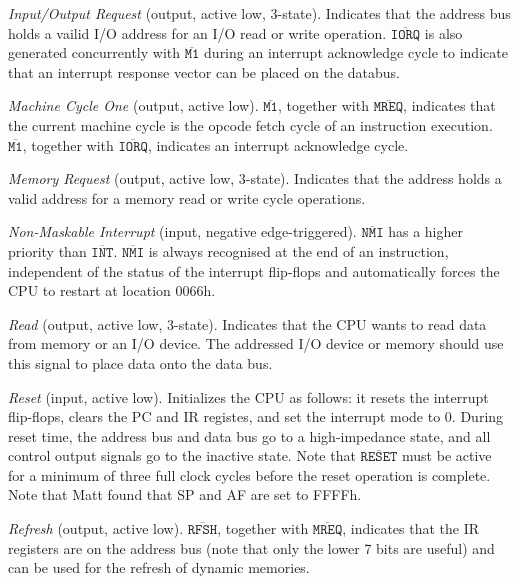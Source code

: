 \documentclass[oneside,a4paper]{book}
\begin{document}
\begin{description}[leftmargin=1.5em]
	\item[$\mathtt{\overline{IORQ}}$]
	{\em Input/Output Request} (output, active low, 3-state). Indicates that
	the address bus holds a vailid I/O address for an I/O read or write 
	operation. $\mathtt{\overline{IORQ}}$ is also generated concurrently with
	$\mathtt{\overline{M1}}$ during an interrupt acknowledge cycle to indicate
	that an interrupt response vector can be placed on the databus.

	\item[$\mathtt{\overline{M1}}$]
	{\em Machine Cycle One} (output, active low). $\mathtt{\overline{M1}}$,
	together with $\mathtt{\overline{MREQ}}$, indicates that the current 
	machine cycle is the opcode fetch cycle of an instruction execution.
	$\mathtt{\overline{M1}}$, together with $\mathtt{\overline{IORQ}}$,
	indicates an interrupt acknowledge cycle.

	\item[$\mathtt{\overline{MREQ}}$]
	{\em Memory Request} (output, active low, 3-state). Indicates that the
	address holds a valid address for a memory read or write cycle operations.

	\item[$\mathtt{\overline{NMI}}$]
	{\em Non-Maskable Interrupt} (input, negative edge-triggered). 
	$\mathtt{\overline{NMI}}$ has a higher priority than 
	$\mathtt{\overline{INT}}$. $\mathtt{\overline{NMI}}$ is always recognised 
	at the end of an instruction, independent of the status of the 
	interrupt flip-flops and automatically forces the CPU to restart at 
	location 0066h.

	\item[$\mathtt{\overline{RD}}$]
	{\em Read} (output, active low, 3-state). Indicates that the 
	CPU wants to read data from memory or an I/O device. The addressed I/O device
	or memory should use this signal to place data onto the data bus.

	\item[$\mathtt{\overline{RESET}}$]
	{\em Reset} (input, active low). Initializes the CPU as follows: it resets
	the interrupt flip-flops, clears the PC and IR registes, and set the 
	interrupt mode to 0. During reset time, the address bus and data bus go
	to a high-impedance state, and all control output signals go to 
	the inactive state. Note that $\mathtt{\overline{RESET}}$ must be active
	for a minimum of three full clock cycles before the reset operation is
	complete. Note that Matt found that SP and AF are set to FFFFh.

	\item[$\mathtt{\overline{RFSH}}$]
	{\em Refresh} (output, active low). $\mathtt{\overline{RFSH}}$, together
	with $\mathtt{\overline{MREQ}}$, indicates that the IR registers are on
	the address bus (note that only the lower 7 bits are useful) and can be 
	used for the refresh of dynamic memories.


\end{description}
\end{document}
